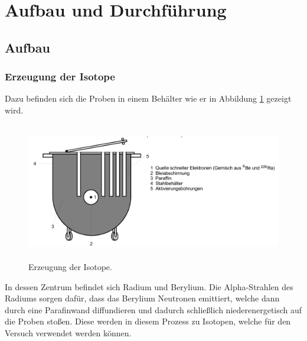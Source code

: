 \section{Aufbau und Durchführung}
\subsection{Aufbau}
\label{sec:Aufbau}
\subsubsection{Erzeugung der Isotope}
Dazu befinden sich die Proben in einem Behälter wie er in Abbildung \ref{abb:1} gezeigt wird.
\begin{figure}[H]
  \centering
  \includegraphics[height=6cm]{ressources/erzeugung.png}
  \caption{Erzeugung der Isotope. \cite{skript}}
  \label{abb:1}
\end{figure}
In dessen Zentrum befindet sich Radium und Berylium.
Die Alpha-Strahlen des Radiums sorgen dafür, dass das Berylium Neutronen emittiert, welche dann durch eine Parafinwand diffundieren und dadurch schließlich niederenergetisch auf die Proben stoßen.
Diese werden in diesem Prozess zu Isotopen, welche für den Versuch verwendet werden können.


